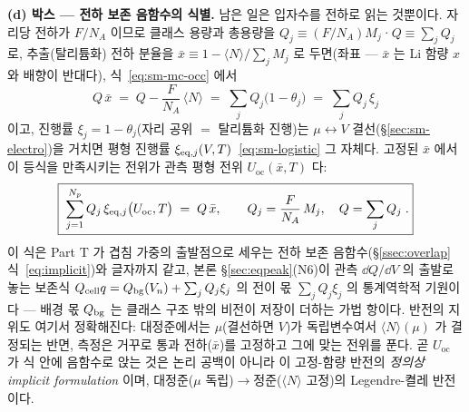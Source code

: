 \textbf{(d) 박스 --- 전하 보존 음함수의 식별.} 남은 일은 입자수를 전하로 읽는 것뿐이다. 자리당 전하가
$F/N_A$ 이므로 클래스 용량과 총용량을 $Q_j\equiv(F/N_A)M_j$·$Q\equiv\sum_jQ_j$ 로, 추출(탈리튬화) 전하
분율을 $\bar x\equiv1-\langle N\rangle/\sum_jM_j$ 로 두면(좌표 --- $\bar x$ 는 Li 함량 $x$ 와 배향이
반대다), 식~\eqref{eq:sm-mc-occ} 에서
\[
Q\,\bar x
\;=\;Q-\frac{F}{N_A}\,\langle N\rangle
\;=\;\sum_j Q_j\bigl(1-\theta_j\bigr)
\;=\;\sum_j Q_j\,\xi_j
\]
이고, 진행률 $\xi_j=1-\theta_j$(자리 공위 $=$ 탈리튬화 진행)는 $\mu\leftrightarrow V$
결선(\S\ref{sec:sm-electro})을 거치면 평형 진행률 $\xi_{\mathrm{eq},j}(V,T)$~\eqref{eq:sm-logistic} 그 자체다. 고정된
$\bar x$ 에서 이 등식을 만족시키는 전위가 관측 평형 전위 $U_\mathrm{oc}(\bar x,T)$ 다:
\begin{equation}
\boxed{\;\sum_{j=1}^{N_p} Q_j\,\xi_{\mathrm{eq},j}\bigl(U_\mathrm{oc},T\bigr)\;=\;Q\,\bar x,
\qquad Q_j=\frac{F}{N_A}\,M_j,\quad Q=\sum_jQ_j\;.}
\label{eq:sm-mc-balance}
\end{equation}
이 식은 Part T 가 겹침 가중의 출발점으로 세우는 전하 보존 음함수(\S\ref{ssec:overlap} 식~\eqref{eq:implicit})와 글자까지
같고, 본론 \S\ref{sec:eqpeak}(N6)이 관측 $\dd Q/\dd V$ 의 출발로 놓는 보존식
$Q_{\mathrm{cell}} q=Q_{\mathrm{bg}}(V_n)+\sum_jQ_j\xi_j$ 의 전이 몫 $\sum_jQ_j\xi_j$ 의 통계역학적 기원이다 --- 배경 몫
$Q_{\mathrm{bg}}$ 는 클래스 구조 밖의 비전이 저장이 더하는 가법 항이다. 반전의 지위도 여기서 정확해진다: 대정준에서는
$\mu$(결선하면 $V$)가 독립변수여서 $\langle N\rangle(\mu)$ 가 결정되는 반면, 측정은 거꾸로 통과 전하($\bar
x$)를 고정하고 그에 맞는 전위를 푼다. 곧 $U_\mathrm{oc}$ 가 식 안에 음함수로 앉는 것은 논리 공백이 아니라 이
고정-함량 반전의 \emph{정의상 implicit formulation} 이며, 대정준($\mu$ 독립)$\to$정준($\langle N\rangle$
고정)의 Legendre-켤레 반전이다.
